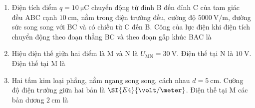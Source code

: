 \begin{enumerate}[label=\bfseries Câu \arabic*:]
\item Điện tích điểm $q=\SI{10}{\micro\coulomb}$ chuyển động từ đỉnh B đến đỉnh C của tam giác đều ABC cạnh $\SI{10}{\centi\meter}$, nằm trong điện trường đều, cường độ $\SI{5000}{\volt/\meter}$, đường sức song song với BC và có chiều từ C đến B. Công của lực điện khi điện tích chuyển động theo đoạn thẳng BC và theo đoạn gấp khúc BAC là

\item Hiệu điện thế giữa hai điểm   là M và N là $U_\text{MN}=\SI{30}{\volt}$. Điện thế tại N là $\SI{10}{\volt}$. Điện thế tại M là 

\item Hai tấm kim loại phẳng, nằm ngang song song, cách nhau $d=\SI{5}{\centi\meter}$. Cường độ điện trường giữa hai bản là $\SI{E4}{\volt/\meter}$. Điện thế tại M các bản dương $\SI{2}{\centi\meter}$ là 


\end{enumerate}
